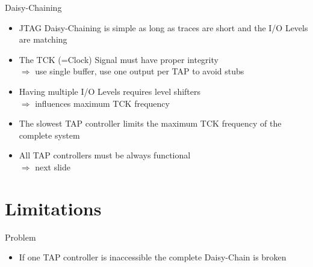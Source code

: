 \documentclass[aspectratio=169,12pt]{beamer}
\begin{document}
\begin{frame}{Daisy-Chaining}
\begin{itemize}
\item JTAG Daisy-Chaining is simple as long as traces are short and the I/O Levels are matching
\item The TCK (=Clock) Signal must have proper integrity\\ $\Rightarrow$ use single buffer, use one output per TAP to avoid stubs
\item Having multiple I/O Levels requires level shifters\\ $\Rightarrow$ influences maximum TCK frequency
\item The slowest TAP controller limits the maximum TCK frequency of the complete system
\item All TAP controllers must be always functional\\ $\Rightarrow$ next slide
\end{itemize}
\end{frame}

\section{Limitations}

\begin{frame}[t]{Problem}
\begin{itemize}
\item If one TAP controller is inaccessible the complete Daisy-Chain is broken
\end{itemize}
\vspace{-2.0em}
\begin{center}

\end{center}
\end{frame}
\end{document}

